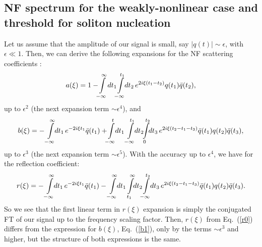 \subsection{NF spectrum for the weakly-nonlinear case and threshold for soliton nucleation}
Let us assume that the amplitude of our signal is small, say $|q(t)| \sim \epsilon$, with $\epsilon \ll 1$. Then, we can derive the following expansions for the NF scattering coefficients \cite{pdt13}:
\begin{equation}\label{a1}
a(\xi) = 1 - \!\! \intop_{-\infty}^{\infty} \! dt_1 \!\! \intop_{-\infty}^{t_1} \!\! dt_2 \, e^{2 i \xi (t_1-t_2)} q(t_1) \bar q(t_2),
\end{equation}
up to $\epsilon^2$ (the next expansion term $\sim \epsilon^4$), and
\begin{equation}\label{b1}
b(\xi) = -\intop_{-\infty}^{\infty} \!\! dt_1 \, e^{- 2 i \xi t_1} \bar q(t_1) +  \!\! \intop_{-\infty}^{t} \!\! dt_1 \intop_{-\infty}^{t_1} \! \!dt_2 \!\! \intop_{0}^{t_2}\!\!  dt_3 \, e^{2 i \xi (t_2-t_1-t_3)} \bar q(t_1) q(t_2) \bar q(t_3),
\end{equation}
up to $\epsilon^3$  (the next expansion term $\sim \epsilon^5$). With the accuracy up to $\epsilon^4$, we have for the reflection coefficient:
\begin{equation}\label{r0}
r(\xi) = - \intop_{-\infty}^{\infty} \!\! dt_1 \, e^{- 2 i \xi t_1} \bar q(t_1) -  \intop_{-\infty}^{\infty} \!\! dt_1 \intop_{t_1}^{\infty} \! \!dt_2 \!\! \intop_{-\infty}^{t_2}\!\!  dt_3  \, e^{2 i \xi (t_2-t_1-t_3)} \bar q(t_1) q(t_2) \bar q(t_3) .
\end{equation}
So we see that the first linear term in $r(\xi)$ expansion is simply the conjugated FT of our signal up to the frequency scaling factor. Then, $r(\xi)$ from Eq.~(\ref{r0}) differs from the expression for $b(\xi)$, Eq.~(\ref{b1}), only by the terms $\sim \epsilon^3$ and higher, but the structure of both expressions is the same.